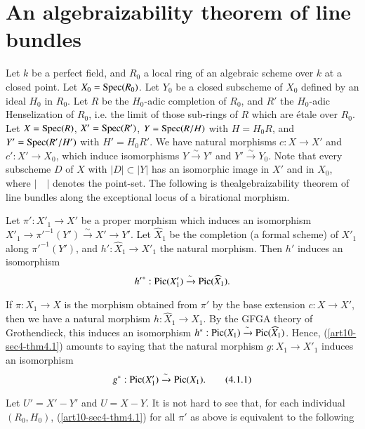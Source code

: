 \section{An algebraizability theorem of line bundles}\label{art10-sec4}

Let $k$ be a perfect field, and $R_{0}$ a local ring of an algebraic scheme over $k$ at a closed point. Let $X_{0}=\operatorname{\mathrm{Spec}} (R_{0})$. Let $Y_{0}$ be a closed subscheme of $X_{0}$ defined by an ideal $H_{0}$ in $R_{0}$. Let $R$ be the $H_{0}$-adic completion of $R_{0}$, and $R'$ the $H_{0}$-adic Henselization of $R_{0}$, i.e. the limit of those sub-rings of $R$ which are \'etale over $R_{0}$. Let $X=\operatorname{\mathrm{Spec}} (R)$, $X'=\operatorname{\mathrm{Spec}} (R')$, $Y=\operatorname{\mathrm{Spec}} (R/H)$ with $H=H_{0}R$, and $Y'=\operatorname{\mathrm{Spec}} (R'/H')$ with $H'=H_{0}R'$. We have natural morphisms $c:X\to X'$ and $c':X'\to X_{0}$, which induce isomorphisms $Y\xrightarrow{\sim}Y'$ and $Y'\xrightarrow{\sim}Y_{0}$. Note that every subscheme $D$ of $X$ with $|D|\subset |Y|$ has an isomorphic image in $X'$ and in $X_{0}$, where $|\quad|$ denotes the point-set. The following is the\pageoriginale algebraizability theorem of line bundles along the exceptional locus of a birational morphism.

\begin{theorem}\label{art10-sec4-thm4.1}
Let $\pi':X'_{1}\to X'$ be a proper morphism which induces an isomorphism $X'_{1}\to {\pi'}^{-1}(Y')\xrightarrow{\sim}X'\to Y'$. Let $\widehat{X}_{1}$ be the completion (a formal scheme) of $X'_{1}$ along ${\pi'}^{-1}(Y')$, and $h':\widehat{X}_{1}\to X'_{1}$ the natural morphism. Then $h'$ induces an isomorphism
$$
{h'}^{*}:\operatorname{\mathrm{Pic}} (X'_{1})\xrightarrow{\sim}\operatorname{\mathrm{Pic}}(\widehat{X}_{1}).
$$
\end{theorem}

If $\pi:X_{1}\to X$ is the morphism obtained from $\pi'$ by the base extension $c:X\to X'$, then we have a natural morphism $h:\widehat{X}_{1}\to X_{1}$. By the GFGA theory of Grothendieck, this induces an isomorphism $h^{*}:\operatorname{\mathrm{Pic}}(X_{1})\xrightarrow{\sim}\operatorname{\mathrm{Pic}}(\widehat{X}_{1})$. Hence, (\ref{art10-sec4-thm4.1}) amounts to saying that the natural morphism $g:X_{1}\to X'_{1}$ induces an isomorphism
\begin{equation*}
g^{*}:\operatorname{\mathrm{Pic}}(X'_{1})\xrightarrow{\sim}\operatorname{\mathrm{Pic}}(X_{1}).\tag{4.1.1}\label{art10-sec4-eq4.1.1}
\end{equation*}

Let $U'=X'-Y'$ and $U=X-Y$. It is not hard to see that, for each individual $(R_{0},H_{0})$, (\ref{art10-sec4-thm4.1}) for all $\pi'$ as above is equivalent to the following

